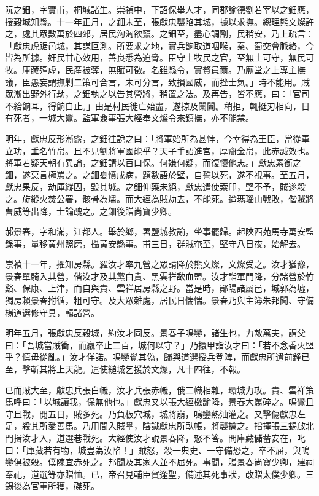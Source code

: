 \begin{pinyinscope}
阮之鈿，字實甫，桐城諸生。崇禎中，下詔保舉人才，同郡諭德劉若宰以之鈿應，授穀城知縣。十一年正月，之鈿未至，張獻忠襲陷其城，據以求撫。總理熊文燦許之，處其眾數萬於四郊，居民洶洶欲竄。之鈿至，盡心調劑，民稍安，乃上疏言：「獻忠虎踞邑城，其謀叵測。所要求之地，實兵餉取道咽喉，秦、蜀交會脈絡，今皆為所據。奸民甘心效用，善良悉為迫脅。臣守土牧民之官，至無土可守，無民可牧。庫藏殫虛，民產被奪，無賦可徵。名雖縣令，實贅員爾。乃廟堂之上專主撫議，臣愚妄謂撫剿二策可合言，未可分言，致損國威，而挫士氣。」時不能用。賊眾漸出野外行劫，之鈿執之以告其營將，稍置之法。及再告，皆不應，曰：「官司不給餉耳，得餉自止。」由是村民徙亡殆盡，遂掠及闤闠。稍拒，輒挺刃相向，日有死者，一城大囂。監軍僉事張大經奉文燦令來鎮撫，亦不能禁。

明年，獻忠反形漸露，之鈿往說之曰：「將軍始所為甚悖，今幸得為王臣，當從軍立功，垂名竹帛。且不見劉將軍國能乎？天子手詔進宮，厚齎金帛，此赤誠效也。將軍若疑天朝有異論，之鈿請以百口保。何嫌何疑，而復懷他志。」獻忠素銜之鈿，遂惡言極罵之。之鈿憂憤成病，題數語於壁，自誓以死，遂不視事。至五月，獻忠果反，劫庫縱囚，毀其城。之鈿仰藥未絕，獻忠遣使索印，堅不予，賊遂殺之。旋縱火焚公署，骸骨為燼。而大經為賊劫去，不能死。迨瑪瑙山戰敗，偕賊將曹威等出降，士論醜之。之鈿後贈尚寶少卿。

郝景春，字和滿，江都人。舉於鄉，署鹽城教諭，坐事罷歸。起陜西苑馬寺萬安監錄事，量移黃州照磨，攝黃安縣事。甫三日，群賊奄至，堅守八日夜，始解去。

崇禎十一年，擢知房縣。羅汝才率九營之眾請降於熊文燦，文燦受之。汝才猶豫，景春單騎入其營，偕汝才及其黨白貴、黑雲祥歃血盟。汝才詣軍門降，分諸營於竹谿、保康、上津，而自與貴、雲祥居房縣之野。當是時，鄖陽諸屬邑，城郭為墟，獨房賴景春拊循，粗可守。及大眾雜處，居民日惴惴。景春乃與主簿朱邦聞、守備楊道選修守具，輯諸營。

明年五月，張獻忠反穀城，約汝才同反。景春子鳴鑾，諸生也，力敵萬夫，謂父曰：「吾城當賊衝，而羸卒止二百，城何以守？」乃擐甲詣汝才曰：「若不念香火盟乎？慎毋從亂。」汝才佯諾。鳴鑾覺其偽，歸與道選授兵登陴，而獻忠所遣前鋒已至，擊斬其將上天龍。遣使縋城乞援於文燦，凡十四往，不報。

已而賊大至，獻忠兵張白幟，汝才兵張赤幟，俄二幟相雜，環城力攻。貴、雲祥策馬呼曰：「以城讓我，保無他也。」獻忠又以張大經檄諭降，景春大罵碎之。鳴鸞且守且戰，閱五日，賊多死。乃負板穴城，城將崩，鳴鑾熱油灌之。又擊傷獻忠左足，殺其所愛善馬。乃用間入賊壘，陰識獻忠所臥帳，將襲擒之。指揮張三錫啟北門揖汝才入，道選巷戰死。大經使汝才說景春降，怒不答。問庫藏儲蓄安在，叱曰：「庫藏若有物，城豈為汝陷！」賊怒，殺一典史、一守備恐之，卒不屈，與鳴鑾俱被殺。僕陳宜赤死之。邦聞及其家人並不屈死。事聞，贈景春尚寶少卿，建祠奉祀，道選等亦贈恤。已，帝召見輔臣賀逢聖，備述其死事狀，改贈太僕少卿。三錫後為官軍所獲，磔死。


\end{pinyinscope}
